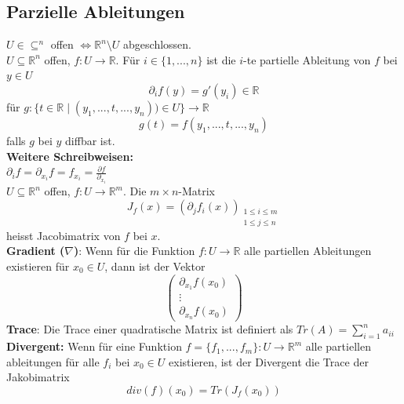 \subsection{Parzielle Ableitungen}
    $U\in\subseteq^n$ offen $\iff \mathbb R^n\setminus U$ abgeschlossen.\\
    $U\subseteq\mathbb R^n$ offen, $f:U\rightarrow\mathbb R$. Für
    $i\in\{1,...,n\}$ ist die $i$-te partielle Ableitung von $f$ bei $y\in U$
    $$\partial_if(y)=g'(y_i)\in\mathbb R$$ für $g:\{t\in\mathbb
    R\mid(y_1,...,t,...,y_n))\in U\}\rightarrow\mathbb R$
    $$g(t)=f(y_1,...,t,...,y_n)$$ falls $g$ bei $y$ diffbar ist.\\
    \textbf{Weitere Schreibweisen:}\\
    $\partial_if=\partial_{x_i}f=f_{x_i}=\frac{\partial f}{\partial_{x_i}}$\\
    $U\subseteq\mathbb R^n$ offen, $f:U\rightarrow\mathbb R^m$. Die $m\times
    n$-Matrix $$J_f(x)=(\partial_jf_i(x))_{\substack{1\leq i\leq m\\1\leq j\leq
    n}}$$
    heisst Jacobimatrix von $f$ bei $x$.\\
  \textbf{Gradient ($\nabla$)}: Wenn für die Funktion $f:U\rightarrow \mathbb R$ alle partiellen Ableitungen existieren für $x_0\in U$, dann ist der Vektor $$\begin{pmatrix}\partial_{x_1}f(x_0)\\\vdots\\\partial_{x_n}f(x_0)\end{pmatrix}$$
  \textbf{Trace}: Die Trace einer quadratische Matrix ist definiert als $Tr(A)=\sum\limits_{i=1}^n a_{ii}$\\
  \textbf{Divergent:} Wenn für eine Funktion $f=\{f_1,...,f_m\}:U\rightarrow\mathbb R^m$ alle partiellen ableitungen für alle $f_i$ bei $x_0\in U$ existieren, ist der Divergent die Trace der Jakobimatrix $$div(f)(x_0)=Tr(J_f(x_0))$$
